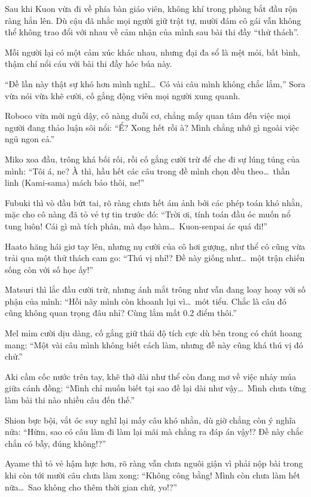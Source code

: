 \documentclass[../main.tex]{subfiles}
\begin{document}
Sau khi Kuon vừa đi về phía bàn giáo viên, không khí trong phòng bắt đầu rộn ràng hẳn lên. Dù cậu đã nhắc mọi người giữ trật tự, mười đám cô gái vẫn không thể không trao đổi với nhau về cảm nhận của mình sau bài thi đầy ``thử thách''.

Mỗi người lại có một cảm xúc khác nhau, nhưng đại đa sổ là mệt mỏi, bất bình, thậm chí nổi cáu với bài thi đầy hóc búa này.

``Đề lần này thật sự khó hơn mình nghĩ\dots\ Có vài câu mình không chắc lắm,'' Sora vừa nói vừa khẽ cười, cố gắng động viên mọi người xung quanh.

Roboco vừa mới ngủ dậy, cô nàng duỗi cơ, chẳng mấy quan tâm đến việc mọi người đang thảo luận sôi nổi: ``Ể? Xong hết rồi à? Mình chẳng nhớ gì ngoài việc ngủ ngon cả.''

Miko xoa đầu, trông khá bối rối, rồi cố gắng cười trừ để che đi sự lúng túng của mình: ``Tôi á, ne? À thì, hầu hết các câu trong đề mình chọn đều theo\dots\ thần linh (Kami-sama) mách bảo thôi, ne!''

Fubuki thì vò đầu bứt tai, rõ ràng chưa hết ám ảnh bởi các phép toán khó nhằn, mặc cho cô nàng đã tỏ vẻ tự tin trước đó: ``Trời ơi, tính toán đầu óc muốn nổ tung luôn! Cái gì mà tích phân, mà đạo hàm\dots\ Kuon-senpai ác quá đi!''

Haato hăng hái giơ tay lên, nhưng nụ cười của cô hơi gượng, như thể cô cũng vừa trải qua một thử thách cam go: ``Thú vị nhỉ!? Đề này giống như\dots\ một trận chiến sống còn với số học ấy!''

Matsuri thì lắc đầu cười trừ, nhưng ánh mắt trông như vẫn đang loay hoay với số phận của mình: ``Hồi nãy mình còn khoanh lụi vì\dots\ mót tiểu. Chắc là câu đó cũng không quan trọng đâu nhỉ? Cùng lắm mất 0.2 điểm thôi.''

Mel mỉm cười dịu dàng, cố gắng giữ thái độ tích cực dù bên trong có chút hoang mang: ``Một vài câu mình không biết cách làm, nhưng đề này cũng khá thú vị đó chứ.''

Aki cầm cốc nước trên tay, khẽ thở dài như thể còn đang mơ về việc nhảy múa giữa cánh đồng: ``Mình chỉ muốn biết tại sao đề lại dài như vậy\dots\ Mình chưa từng làm bài thi nào nhiều câu đến thế.''

Shion bực bội, vắt óc suy nghĩ lại mấy câu khó nhằn, dù giờ chẳng còn ý nghĩa nữa: ``Hừm, sao có câu làm đi làm lại mãi mà chẳng ra đáp án vậy!? Đề này chắc chắn có bẫy, đúng không!?''

Ayame thì tỏ vẻ hậm hực hơn, rõ ràng vẫn chưa nguôi giận vì phải nộp bài trong khi còn tới mười câu chưa làm xong: ``Không công bằng! Mình còn chưa làm hết nữa\dots\ Sao không cho thêm thời gian chứ, yo!?''
\end{document}
